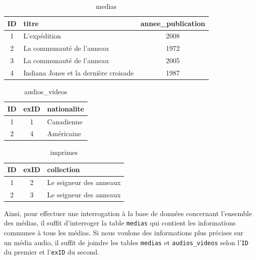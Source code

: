 \documentclass[letter, 11pt]{report}
\begin{document}
\begin{table}[htbp]
	\caption{medias}
	\label{tab:sf-medias}
	\begin{center}
		\begin{tabular}{|c|l|c|}
			\hline
			ID & titre                                 & annee\_publication \\
			\hline
			1  & L'expédition                          & 2008 \\
			2  & La communauté de l'anneau             & 1972 \\
			3  & La communauté de l'anneau             & 2005 \\
			4  & Indiana Jones et la dernière croisade & 1987 \\
			\hline
		\end{tabular}
	\end{center}
\end{table}

\begin{table}[h!tbp]
	\caption{audios\_videos}
	\label{tab:sf-audios-videos}
	\begin{center}
		\begin{tabular}{|c|c|l|}
			\hline
			ID & exID & nationalite \\
			\hline
			1  & 1    & Canadienne \\
			2  & 4    & Américaine \\
			\hline
		\end{tabular}
	\end{center}
\end{table}

\begin{table}[htbp]
	\caption{imprimes}
	\label{tab:sf-imprimes}
	\begin{center}
		\begin{tabular}{|c|c|l|}
			\hline
			ID & exID & collection \\
			\hline
			1  & 2    & Le seigneur des anneaux \\
			2  & 3    & Le seigneur des anneaux \\
			\hline
		\end{tabular}
	\end{center}
\end{table}

Ainsi, pour effectuer une interrogation à la base de données concernant l'ensemble des médias, il suffit d'interroger la table \texttt{medias} qui contient les informations communes à tous les médias. Si nous voulons des informations plus précises sur un média audio, il suffit de joindre les tables \texttt{medias} et \texttt{audios\_videos} selon l'\texttt{ID} du premier et l'\texttt{exID} du second.
\end{document}
